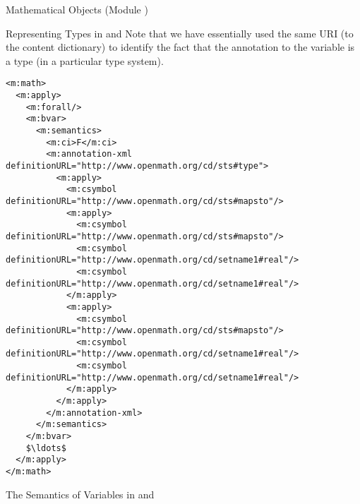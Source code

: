 \begin{tchapter}[id=mobj,short=Mathematical Objects]{Mathematical Objects (Module {})}
\begin{tsection}[id=mobj:types]{Representing Types in {\cmathml} and {\openmath}}
Note that we have essentially used the same URI (to the {} content
dictionary) to identify the fact that the annotation to the variable is a type (in
a particular type system).

 \begin{lstlisting}[language=MathML,label=lst:complex-type-mathml,mathescape,
     caption={A Complex Type in {\cmathml}},
     index={math,apply,forall,bvar,ci,csymbol}]
<m:math>
  <m:apply>  
    <m:forall/>
    <m:bvar>
      <m:semantics>
        <m:ci>F</m:ci>
        <m:annotation-xml definitionURL="http://www.openmath.org/cd/sts#type">
          <m:apply>
            <m:csymbol definitionURL="http://www.openmath.org/cd/sts#mapsto"/>
            <m:apply>
              <m:csymbol definitionURL="http://www.openmath.org/cd/sts#mapsto"/>
              <m:csymbol definitionURL="http://www.openmath.org/cd/setname1#real"/>
              <m:csymbol definitionURL="http://www.openmath.org/cd/setname1#real"/>
            </m:apply>        
            <m:apply>
              <m:csymbol definitionURL="http://www.openmath.org/cd/sts#mapsto"/>
              <m:csymbol definitionURL="http://www.openmath.org/cd/setname1#real"/>
              <m:csymbol definitionURL="http://www.openmath.org/cd/setname1#real"/>
            </m:apply>        
          </m:apply>
        </m:annotation-xml>
      </m:semantics>
    </m:bvar>
    $\ldots$
  </m:apply>
</m:math>
 \end{lstlisting}
\end{tsection}

\begin{tsection}[id=sem-var,short=Semantics of Variables]{The Semantics of Variables in
    {\openmath} and {\cmathml}}
 

\end{tsection}
\end{tchapter}
